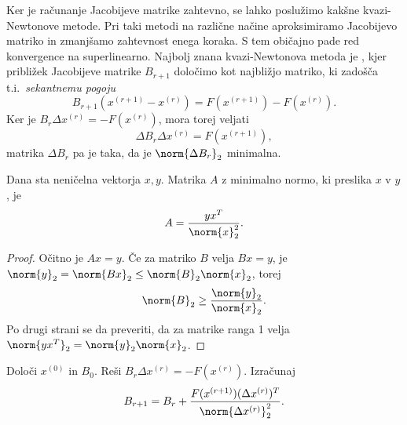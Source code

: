 
Ker je računanje Jacobijeve matrike zahtevno, se lahko poslužimo kakšne
kvazi-Newtonove metode.
Pri taki metodi na različne načine aproksimiramo Jacobijevo matriko in zmanjšamo
zahtevnost enega koraka.
S tem običajno pade red konvergence na superlinearno.
Najbolj znana kvazi-Newtonova metoda je , kjer približek
Jacobijeve matrike $B_{r+1}$ določimo kot najbližjo matriko, ki zadošča
t.i.~\emph{sekantnemu pogoju}
\[
  B_{r+1} (x^{(r+1)} - x^{(r)}) = F(x^{(r+1)}) - F(x^{(r)}).
\]
Ker je $B_r \Delta x^{(r)} = - F(x^{(r)})$, mora torej veljati
\[
  \Delta B_r \Delta x^{(r)} = F(x^{(r+1)}),
\]
matrika $\Delta B_r$ pa je taka, da je $\norm{\Delta B_r}_2$ minimalna.

\begin{lema}
  Dana sta neničelna vektorja $x, y$.
  Matrika $A$ z minimalno normo, ki preslika $x$ v $y$, je
  \[
	A = \frac{y x^T}{\norm{x}_2^2}.
  \]
\end{lema}

\begin{proof}
  Očitno je $Ax = y$.
  Če za matriko $B$ velja $Bx = y$, je $\norm{y}_2 = \norm{Bx}_2 \le \norm{B}_2
  \norm{x}_2$, torej
  \[
	\norm{B}_2 \ge \frac{\norm{y}_2}{\norm{x}_2}.
  \]
  Po drugi strani se da preveriti, da za matrike ranga 1 velja $\norm{y x^T}_2 =
  \norm{y}_2 \norm{x}_2$.
\end{proof}

\begin{algorithm}
  \caption{Broydnova metoda}
  \label{alg:broydnova-metoda}
  \begin{algorithmic}
	\State Določi $x^{(0)}$ in $B_0$.
	\State Reši $B_r \Delta x^{(r)} = - F(x^{(r)})$.
	\State Izračunaj
	\[
	  B_{r+1} = B_r + \frac{F(x^{(r+1)}) (\Delta x^{(r)})^T}{\norm{\Delta
		  x^{(r)}}_2^2}.
	\]
	\EndFor
  \end{algorithmic}
\end{algorithm}

